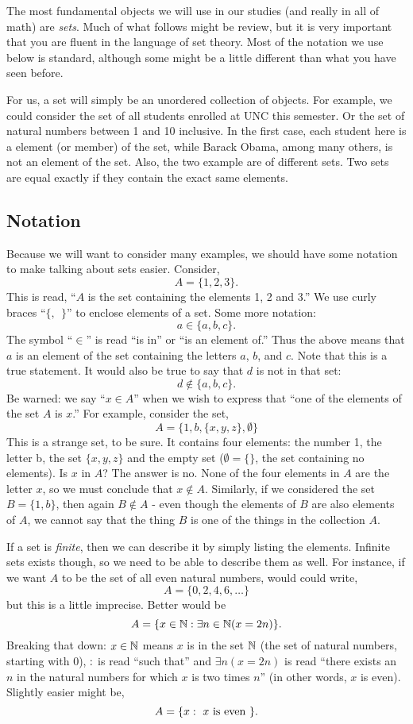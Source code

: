\documentclass[12pt]{article}
\begin{document}
The most fundamental objects we will use in our studies (and really in all of math) are \textit{sets}.  Much of what follows might be review, but it is very important that you are fluent in the language of set theory.  Most of the notation we use below is standard, although some might be a little different than what you have seen before.

For us, a set will simply be an unordered collection of objects.  For example, we could consider the set of all students enrolled at UNC this semester.  Or the set of natural numbers between 1 and 10 inclusive.  In the first case, each student here is a element (or member) of the set, while Barack Obama, among many others, is not an element of the set.  Also, the two example are of different sets.  Two sets are equal exactly if they contain the exact same elements.



\subsection{Notation}

Because we will want to consider many examples, we should have some notation to make talking about sets easier.  Consider,
\[ A = \{1, 2, 3\}.\]
This is read, ``$A$ is the set containing the elements 1, 2 and 3.''  We use curly braces ``$\{,~~ \}$'' to enclose elements of a set.  Some more notation:
\[ a \in \{a, b, c\}. \]
The symbol ``$\in$'' is read ``is in'' or ``is an element of.''  Thus the above means that $a$ is an element of the set containing the letters $a$, $b$, and $c$.  Note that this is a true statement.  It would also be true to say that $d$ is not in that set:
\[ d \not\in \{a, b, c\}.\]
Be warned: we say ``$x \in A$'' when we wish to express that ``one of the elements of the set $A$ is $x$.''  For example, consider the set,
\[A = \{1, b, \{x, y, z\}, \emptyset\}\]
This is a strange set, to be sure. It contains four elements: the number 1, the letter b, the set $\{x,y,z\}$ and the empty set ($\emptyset = \{ \}$, the set containing no elements).  Is $x$ in $A$?  The answer is no.  None of the four elements in $A$ are the letter $x$, so we must conclude that $x \notin A$.  Similarly, if we considered the set $B = \{1,b\}$, then again $B \notin A$ - even though the elements of $B$ are also elements of $A$, we cannot say that the thing $B$ is one of the things in the collection $A$. 

If a set is \emph{finite}, then we can describe it by simply listing the elements.  Infinite sets exists though, so we need to be able to describe them as well.  For instance, if we want $A$ to be the set of all even natural numbers, would could write,
\[ A = \{0, 2, 4, 6, \ldots\}\]
but this is a little imprecise.  Better would be
\[ A = \{x \in \mathbb N : \exists n\in \mathbb N ( x = 2 n)\}.\]
Breaking that down: $x \in \mathbb N$ means $x$ is in the set $\mathbb N$ (the set of natural numbers, starting with 0), $:$ is read ``such that'' and $\exists n (x = 2n)$ is read ``there exists an $n$ in the natural numbers for which $x$ is two times $n$'' (in other words, $x$ is even).  Slightly easier might be,
\[ A = \{x : \mbox{ $x$ is even }\}. \]
\end{document}
